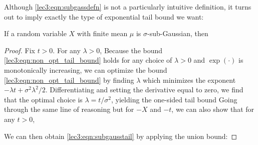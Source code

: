 \noindent Although \eqref{lec3:eqn:subgassdefn} is not a particularly intuitive definition, it turns out to imply exactly the type of exponential tail bound we want:

\begin{theorem}\label{lec3:thm:subgausstail}
    If a random variable $X$ with finite mean $\mu$ is $\sigma$-sub-Gaussian, then
\end{theorem}

\begin{proof}
Fix $t > 0$. For any $\lambda > 0$,
Because the bound \eqref{lec3:eqn:non_opt_tail_bound} holds for any choice of $\lambda > 0$ and $\exp(\cdot)$ is monotonically increasing, we can optimize the bound \eqref{lec3:eqn:non_opt_tail_bound} by finding $\lambda$ which minimizes the exponent $-\lambda t + \sigma^2 \lambda^2/2$. Differentiating and setting the derivative equal to zero, we find that the optimal choice is $\lambda = t/\sigma^2$, yielding the one-sided tail bound
Going through the same line of reasoning but for $-X$ and $-t$, we can also show that for any $t > 0$,

We can then obtain \eqref{lec3:eqn:subgausstail} by applying the union bound:
\end{proof}

